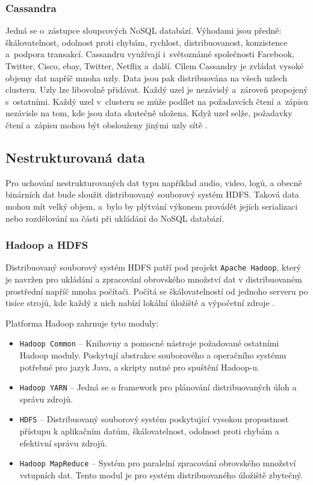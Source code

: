 \subsubsection{Cassandra}
Jedná se o~zástupce sloupcových NoSQL databází. Výhodami jsou předně: škálovatelnost, odolnost proti chybám, rychlost, distribuovanost, konzistence a~podpora transakcí. Cassandru využívají i~světoznámé společnosti Facebook, Twitter, Cisco, ebay, Twitter, Netflix a~další. Cílem Cassandry je zvládat vysoké objemy dat napříč mnoha uzly. Data jsou pak distribuována na všech uzlech clusteru. Uzly lze libovolně přidávat. Každý uzel je nezávislý a~zároveň propojený s~ostatními. Každý uzel v~clusteru se může podílet na požadavcích čtení a~zápisu nezávisle na tom, kde jsou data skutečně uložena. Když uzel selže, požadavky čtení a~zápisu mohou být obslouženy jinými uzly sítě \cite{cassandraTutorialsPoint}.

\subsection{Nestrukturovaná data}
Pro uchování nestrukturovaných dat typu například audio, video, logů, a obecně binárních dat bude sloužit distribuovaný souborový systém HDFS. Taková data mohou mít velký objem, a~bylo by plýtvání výkonem provádět jejich serializaci nebo rozdělování na části při ukládání do NoSQL databází.

\subsubsection{Hadoop a HDFS}
Distribuovaný souborový systém HDFS patří pod projekt \texttt{Apache Hadoop}, který je navržen pro ukládání a zpracování obrovského množství dat v distribuovaném prostřední napříč mnoha počítači. Počítá se škálovatelností od jednoho serveru po tisíce strojů, kde každý z nich nabízí lokální úložiště a výpočetní zdroje \cite{hadoopTutorialsPoint}.

\vspace{0.5cm}
\noindent Platforma Hadoop zahrnuje tyto moduly:

\begin{itemize}
    \item \texttt{Hadoop Common} -- Knihovny a pomocné nástroje požadované ostatními Hadoop moduly. Poskytují abstrakce souborového a operačního systému potřebné pro jazyk Java, a skripty nutné pro spuštění Hadoop-u.
    
    \item \texttt{Hadoop YARN} -- Jedná se o framework pro plánování distribuovaných úloh a správu zdrojů.
    
    \item \texttt{HDFS} -- Distribuovaný souborový systém poskytující vysokou propustnost přístupu k aplikačním datům, škálovatelnost, odolnost proti chybám a efektivní správu zdrojů.
    
    \item \texttt{Hadoop MapReduce} -- Systém pro paralelní zpracování obrovského množství vstupních dat. Tento modul je pro systém distribuovaného úložiště zbytečný.
\end{itemize}

